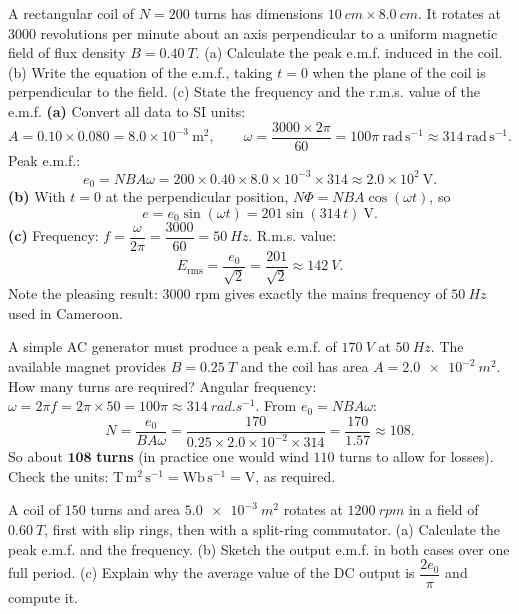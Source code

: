 \documentclass[11pt]{article}
\newcounter{popsec}
\newcounter{popsub}
\newcommand{\courssub}[1]{%
  \stepcounter{popsub}%
  \par\vspace{9pt}\noindent{\popxbold\fontsize{11.5}{13}\selectfont\color{popink}{\color{poporange}\thepopsec.\thepopsub}\hspace{6pt}#1}\par\nopagebreak\vspace{4pt}
}
\begin{document}
\courssub{Worked Examples}

\begin{exoresolu}
A rectangular coil of $N = 200$ turns has dimensions $\SI{10}{cm} \times \SI{8.0}{cm}$. It rotates at $3000$ revolutions per minute about an axis perpendicular to a uniform magnetic field of flux density $B = \SI{0.40}{T}$. (a) Calculate the peak e.m.f. induced in the coil. (b) Write the equation of the e.m.f., taking $t = 0$ when the plane of the coil is perpendicular to the field. (c) State the frequency and the r.m.s. value of the e.m.f.
\tcblower
\textbf{(a)} Convert all data to SI units:
\[ A = 0.10 \times 0.080 = 8.0\times 10^{-3}\ \mathrm{m^2}, \qquad \omega = \frac{3000 \times 2\pi}{60} = 100\pi\ \mathrm{rad\,s^{-1}} \approx 314\ \mathrm{rad\,s^{-1}}. \]
Peak e.m.f.:
\[ e_0 = NBA\omega = 200 \times 0.40 \times 8.0\times 10^{-3} \times 314 \approx 2.0\times 10^{2}\ \mathrm{V}. \]
\textbf{(b)} With $t = 0$ at the perpendicular position, $N\Phi = NBA\cos(\omega t)$, so
\[ e = e_0\sin(\omega t) = 201\sin(314\,t)\ \mathrm{V}. \]
\textbf{(c)} Frequency: $f = \dfrac{\omega}{2\pi} = \dfrac{3000}{60} = \SI{50}{Hz}$. R.m.s. value:
\[ E_{\mathrm{rms}} = \frac{e_0}{\sqrt{2}} = \frac{201}{\sqrt{2}} \approx \SI{142}{V}. \]
Note the pleasing result: $3000$ rpm gives exactly the mains frequency of $\SI{50}{Hz}$ used in Cameroon.
\end{exoresolu}

\begin{exoresolu}
A simple AC generator must produce a peak e.m.f. of $\SI{170}{V}$ at $\SI{50}{Hz}$. The available magnet provides $B = \SI{0.25}{T}$ and the coil has area $A = \SI{2.0e-2}{m^2}$. How many turns are required?
\tcblower
Angular frequency: $\omega = 2\pi f = 2\pi \times 50 = 100\pi \approx \SI{314}{rad.s^{-1}}$.
From $e_0 = NBA\omega$:
\[ N = \frac{e_0}{BA\omega} = \frac{170}{0.25 \times 2.0\times 10^{-2} \times 314} = \frac{170}{1.57} \approx 108. \]
So about $\mathbf{108}$ \textbf{turns} (in practice one would wind $110$ turns to allow for losses). Check the units: $\mathrm{T\,m^2\,s^{-1}} = \mathrm{Wb\,s^{-1}} = \mathrm{V}$, as required.
\end{exoresolu}

\begin{exercice}[From AC to DC]
A coil of $150$ turns and area $\SI{5.0e-3}{m^2}$ rotates at $\SI{1200}{rpm}$ in a field of $\SI{0.60}{T}$, first with slip rings, then with a split-ring commutator. (a) Calculate the peak e.m.f. and the frequency. (b) Sketch the output e.m.f. in both cases over one full period. (c) Explain why the average value of the DC output is $\dfrac{2e_0}{\pi}$ and compute it.
\end{exercice}
\end{document}
